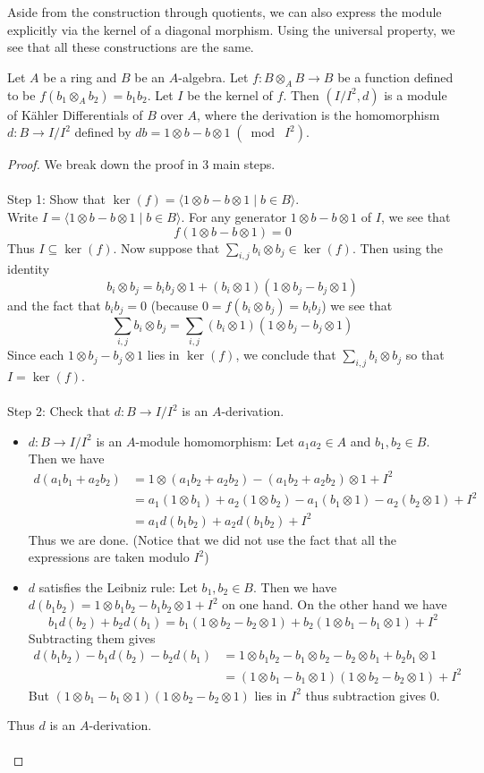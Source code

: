 \documentclass[a4paper]{article}
\begin{document}
Aside from the construction through quotients, we can also express the module explicitly via the kernel of a diagonal morphism. Using the universal property, we see that all these constructions are the same. 

\begin{prp}{}{} Let $A$ be a ring and $B$ be an $A$-algebra. Let $f:B\otimes_A B\to B$ be a function defined to be $f(b_1\otimes_A b_2)=b_1b_2$. Let $I$ be the kernel of $f$. Then $(I/I^2,d)$ is a module of Kähler Differentials of $B$ over $A$, where the derivation is the homomorphism $d:B\to I/I^2$ defined by $db=1\otimes b-b\otimes1\;(\bmod\;I^2)$. \tcbline
\begin{proof}
We break down the proof in 3 main steps. \\~\\
Step 1: Show that $\ker(f)=\langle 1\otimes b-b\otimes 1\;|\;b\in B\rangle$. \\
Write $I=\langle 1\otimes b-b\otimes 1\;|\;b\in B\rangle$. For any generator $1\otimes b-b\otimes 1$ of $I$, we see that $$f(1\otimes b-b\otimes 1)=0$$ Thus $I\subseteq\ker(f)$. Now suppose that $\sum_{i,j} b_i\otimes b_j\in\ker(f)$. Then using the identity $$b_i\otimes b_j=b_ib_j\otimes 1+(b_i\otimes 1)(1\otimes b_j-b_j\otimes 1)$$ and the fact that $b_ib_j=0$ (because $0=f(b_i\otimes b_j)=b_ib_j$) we see that $$\sum_{i,j} b_i\otimes b_j=\sum_{i,j}(b_i\otimes 1)(1\otimes b_j-b_j\otimes 1)$$ Since each $1\otimes b_j-b_j\otimes 1$ lies in $\ker(f)$, we conclude that $\sum_{i,j}b_i\otimes b_j$ so that $I=\ker(f)$. \\~\\
Step 2: Check that $d:B\to I/I^2$ is an $A$-derivation. \\
\begin{itemize}
\item $d:B\to I/I^2$ is an $A$-module homomorphism: Let $a_1a_2\in A$ and $b_1,b_2\in B$. Then we have 
\begin{align*}
d(a_1b_1+a_2b_2)&=1\otimes (a_1b_2+a_2b_2)-(a_1b_2+a_2b_2)\otimes 1+I^2\\
&=a_1(1\otimes b_1)+a_2(1\otimes b_2)-a_1(b_1\otimes 1)-a_2(b_2\otimes 1)+I^2\\
&=a_1d(b_1b_2)+a_2d(b_1b_2)+I^2
\end{align*}
Thus we are done. (Notice that we did not use the fact that all the expressions are taken modulo $I^2$)
\item $d$ satisfies the Leibniz rule: Let $b_1,b_2\in B$. Then we have $d(b_1b_2)=1\otimes b_1b_2-b_1b_2\otimes 1+I^2$ on one hand. On the other hand we have $$b_1d(b_2)+b_2d(b_1)=b_1(1\otimes b_2-b_2\otimes 1)+b_2(1\otimes b_1-b_1\otimes 1)+I^2$$ Subtracting them gives 
\begin{align*}
d(b_1b_2)-b_1d(b_2)-b_2d(b_1)&=1\otimes b_1b_2-b_1\otimes b_2-b_2\otimes b_1+b_2b_1\otimes 1\\
&=(1\otimes b_1-b_1\otimes 1)(1\otimes b_2-b_2\otimes 1)+I^2
\end{align*}
But $(1\otimes b_1-b_1\otimes 1)(1\otimes b_2-b_2\otimes 1)$ lies in $I^2$ thus subtraction gives $0$. 
\end{itemize}
Thus $d$ is an $A$-derivation. \\~\\


\end{proof}
\end{prp}
\end{document}
